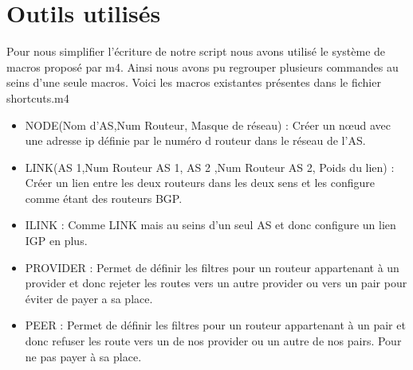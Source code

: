 \documentclass[10pt,a4paper,twocolumn]{article}
\begin{document}
\section{Outils utilisés}
Pour nous simplifier l'écriture de notre script nous avons utilisé le système de macros proposé par m4.
Ainsi nous avons pu regrouper plusieurs commandes au seins d'une seule macros. Voici les macros existantes présentes dans le fichier shortcuts.m4
\begin{itemize}
\item NODE(Nom d'AS,Num Routeur, Masque de réseau) : Créer un nœud avec une adresse ip définie par le numéro d routeur dans le réseau de l'AS.
\item LINK(AS 1,Num Routeur AS 1, AS 2 ,Num Routeur AS 2, Poids du lien) :
Créer un lien entre les deux routeurs dans les deux sens et les configure comme étant des routeurs BGP.
\item ILINK : Comme LINK mais au seins d'un seul AS et donc configure un lien IGP en plus.
\item PROVIDER : Permet de définir les filtres pour un routeur appartenant à un provider et donc rejeter les routes vers un autre provider ou vers un pair pour éviter de payer a sa place.
\item PEER : Permet de définir les filtres pour un routeur appartenant à un pair et donc refuser les route vers un de nos provider ou un autre de nos pairs. Pour ne pas payer à sa place.

\end{itemize}
\end{document}
